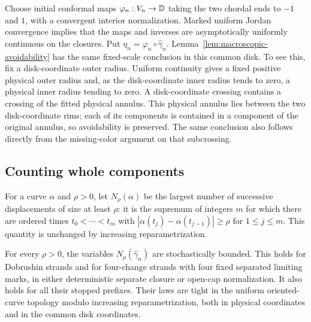 Choose initial conformal maps $\varphi_n:V_n\to\mathbb D$ taking the two
chordal ends to $-1$ and $1$, with a convergent interior normalization.
Marked uniform Jordan convergence implies that the maps and inverses
are asymptotically uniformly continuous on the closures.  Put
$\eta_n=\varphi_n\circ\widehat\gamma_n$.
Lemma~\ref{lem:macroscopic-avoidability} has the same fixed-scale
conclusion in this common disk.  To see this, fix a disk-coordinate
outer radius.  Uniform continuity gives a fixed positive physical
outer radius and, as the disk-coordinate inner radius tends to zero,
a physical inner radius tending to zero.  A disk-coordinate crossing
contains a crossing of the fitted physical annulus.  This physical
annulus lies between the two disk-coordinate rims; each of its
components is contained in a component of the original annulus, so
avoidability is preserved.  The same conclusion also follows directly
from the missing-color argument on that subcrossing.

\subsection{Counting whole components}

For a curve $\alpha$ and $\rho>0$, let $N_\rho(\alpha)$ be the largest
number of successive displacements of size at least $\rho$: it is
the supremum of integers $m$ for which there are ordered times
$t_0<\cdots<t_m$ with
$|\alpha(t_j)-\alpha(t_{j-1})|\ge\rho$ for $1\le j\le m$.
This quantity is unchanged by increasing reparametrization.

\begin{proposition}
\label{prop:curve-tightness}
For every $\rho>0$, the variables $N_\rho(\widehat\gamma_n)$ are
stochastically bounded.  This holds for Dobrushin strands and for
four-change strands with four fixed separated limiting marks, in
either deterministic separate closure or open-cap normalization.
It also holds for all their stopped prefixes.  Their laws are tight
in the uniform oriented-curve topology modulo increasing
reparametrization, both in physical coordinates and in the common
disk coordinates.
\end{proposition}

